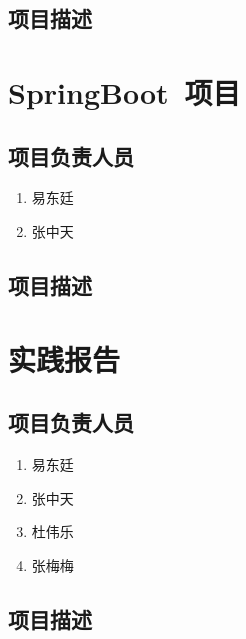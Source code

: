 \subsection{项目描述}

\section{SpringBoot~项目}
\subsection{项目负责人员}
\begin{enumerate}
    \item{易东廷}
    \item{张中天}
\end{enumerate}
\subsection{项目描述}

\section{实践报告}
\subsection{项目负责人员}
\begin{enumerate}
    \item{易东廷}
    \item{张中天}
    \item{杜伟乐}
    \item{张梅梅}
\end{enumerate}
\subsection{项目描述}